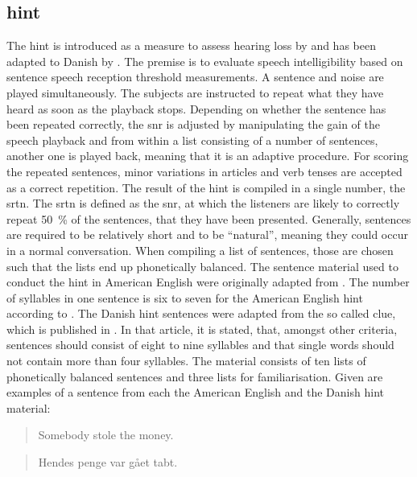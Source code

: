 \subsection{\gls{hint}}\label{ssec:hint}
The \gls{hint} is introduced as a measure to assess hearing loss by \citep{nilsson_95} and has been adapted to Danish by \citep{hint_2011}.
The premise is to evaluate speech intelligibility based on sentence speech reception threshold measurements. 
A sentence and noise are played simultaneously. The subjects are instructed to repeat what they have heard as soon as the playback stops. 
Depending on whether the sentence has been repeated correctly, the \gls{snr} is adjusted by manipulating the gain of the speech playback and from within a list consisting of a number of sentences, another one is played back, meaning that it is an adaptive procedure.
For scoring the repeated sentences, minor variations in articles and verb tenses are accepted as a correct repetition.
The result of the \gls{hint} is compiled in a single number, the \gls{srtn}.
The \gls{srtn} is defined as the \gls{snr}, at which the listeners are likely to correctly repeat \SI{50}{\percent} of the sentences, that they have been presented.
Generally, sentences are required to be relatively short and to be \enquote{natural}, meaning they could occur in a normal conversation.
When compiling a list of sentences, those are chosen such that the lists end up phonetically balanced. 
The sentence material used to conduct the \gls{hint} in American English were originally adapted from \citep{bench_bamford_79}.
The number of syllables in one sentence is six to seven for the American English \gls{hint} according to \citep{nilsson_95}.
The Danish \gls{hint} sentences were adapted from the so called \gls{clue}, which is published in \citep{nielsen_dau_09}. In that article, it is stated, that, amongst other criteria, sentences should consist of eight to nine syllables and that single words should not contain more than four syllables.
The material consists of ten lists of phonetically balanced sentences and three lists for familiarisation.
Given are examples of a sentence from each the American English and the Danish \gls{hint} material:
\begin{quote}
Somebody stole the money.
\end{quote}
\begin{quote}
Hendes penge var gået tabt.
\end{quote}
